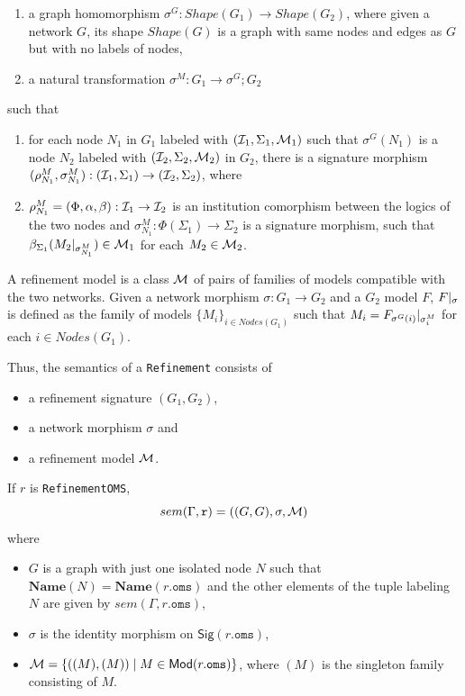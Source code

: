 \documentclass[10pt,fleqn,final]{scrreprt}
\newcommand*{\syntax}[1]{\texttt{#1}}
\newcommand{\Sig}{\mathsf{Sig}}
\newcommand{\Name}{\ensuremath{\mathbf{Name}}}
\newenvironment{definitions}[0]{\medskip }{}
\begin{document}
\begin{definitions}
\begin{enumerate}
\item a 
graph homomorphism $\sigma^G: Shape(G_1)\to Shape(G_2)$, where given a network $G$, its shape 
$Shape(G)$ is a graph with same nodes and edges as $G$ but with no labels of nodes,
\item a natural transformation $\sigma^M : G_1 \to \sigma^G;G_2$
\end{enumerate}
 such that
\begin{enumerate}
\item for each node $N_1$ in $G_1$ labeled with $({\cal I}_1, \Sigma_1, {\cal M}_1)$
such that $\sigma^G(N_1)$ is a node $N_2$ labeled with $({\cal I}_2,\Sigma_2,{\cal M}_2)$ in $G_2$,
there is a signature morphism $(\rho^M_{N_1},\sigma^M_{N_1}) : ({\cal I}_1, \Sigma_1) \to ({\cal I}_2, \Sigma_2)$,
where 
\item $\rho^M_{N_1} = (\Phi, \alpha, \beta) : {\cal I}_1 \to {\cal I}_2$ is an institution comorphism between the logics of the two nodes and
$\sigma^M_{N_1} : \Phi(\Sigma_1) \to \Sigma_2$ is a signature morphism,
such that $\beta_{\Sigma_1}(M_2|_{\sigma^M_{N_1}}) \in {\cal M}_1$ for each $M_2 \in  {\cal M}_2$.
\end{enumerate}


A refinement model is a class ${\cal M}$ 
of pairs of families of models compatible with the two networks. 
Given a network morphism $\sigma:G_1\to G_2$ and a $G_2$ model $F$, 
 $F|_{\sigma}$ is defined as the family of models 
$\{M_i\}_{i\in Nodes(G_1)}$ such that
$M_i = F_{\sigma^G(i)}|_{\sigma^M_{i}}$ for each $i\in Nodes(G_1)$.

Thus, the semantics of a \syntax{Refinement} consists of
\begin{itemize}
 \item a refinement signature $(G_1,G_2)$,
 \item a network morphism $\sigma$ and
 \item a refinement model ${\cal M}$.
\end{itemize}
\medskip

If $r$ is \syntax{RefinementOMS},
$$sem(\Gamma, \syntax{r}) = 
   ((G, G), \sigma, \cM) $$
  \noindent where 
  \begin{itemize}
  \item $G$ is a graph with just one isolated node $N$
  such that $\Name(N) = \Name(r.\syntax{oms})$
  and the other elements of the tuple labeling
  $N$ are given by $sem(\Gamma,r.\syntax{oms})$,
  \item $\sigma$ is the identity morphism on 
  $\Sig(r.\syntax{oms})$,  
  \item $\cM = \{((M), (M)) \mid M \in \Mod(r.\syntax{oms})\}$,
   where $(M)$ is the singleton family consisting of $M$.
  \end{itemize}


\end{definitions}
\end{document}
